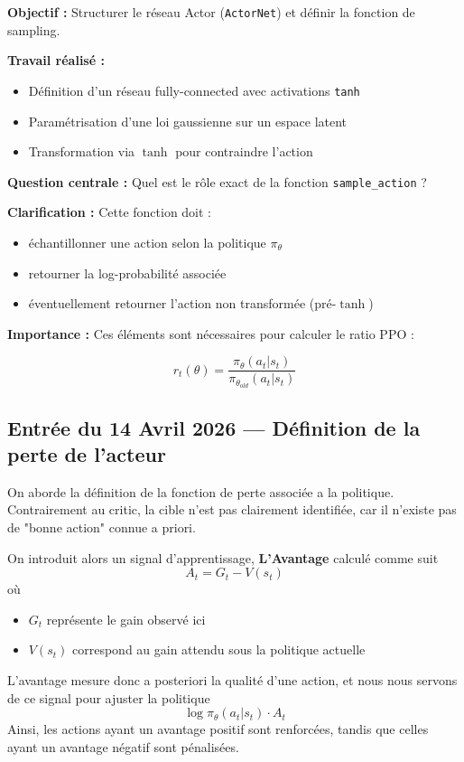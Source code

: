 \documentclass[11pt,a4paper]{article}
\begin{document}
\textbf{Objectif :}  
Structurer le réseau Actor (\texttt{ActorNet}) et définir la fonction de sampling.

\textbf{Travail réalisé :}
\begin{itemize}
    \item Définition d'un réseau fully-connected avec activations \texttt{tanh}
    \item Paramétrisation d'une loi gaussienne sur un espace latent
    \item Transformation via $\tanh$ pour contraindre l'action
\end{itemize}

\textbf{Question centrale :}  
Quel est le rôle exact de la fonction \texttt{sample\_action} ?

\textbf{Clarification :}
Cette fonction doit :
\begin{itemize}
    \item échantillonner une action selon la politique $\pi_\theta$
    \item retourner la log-probabilité associée
    \item éventuellement retourner l'action non transformée (pré-$\tanh$)
\end{itemize}

\textbf{Importance :}  
Ces éléments sont nécessaires pour calculer le ratio PPO :

\[
r_t(\theta) = \frac{\pi_\theta(a_t|s_t)}{\pi_{\theta_{old}}(a_t|s_t)}
\]

\subsection*{Entrée du 14 Avril 2026 --- Définition de la perte de l'acteur}
On aborde la définition de la fonction de perte associée a la politique. Contrairement au critic, la cible n'est pas clairement identifiée, car il n'existe pas de "bonne action" connue a priori. 

On introduit alors un signal d'apprentissage, 
\textbf{L'Avantage} calculé comme suit
\[
A_t = G_t - V(s_t)
\]
où 
\begin{itemize}
    \item $G_t$ représente le gain observé ici
    \item $V(s_t)$ correspond au gain attendu sous la politique actuelle
\end{itemize}
L'avantage mesure donc a posteriori la qualité d'une action, et nous nous servons de ce signal pour ajuster la politique
\[
\log\pi_\theta (a_t|s_t)\cdot A_t
\]
Ainsi, les actions ayant un avantage positif sont renforcées, tandis que celles ayant un avantage négatif sont pénalisées.
\end{document}
